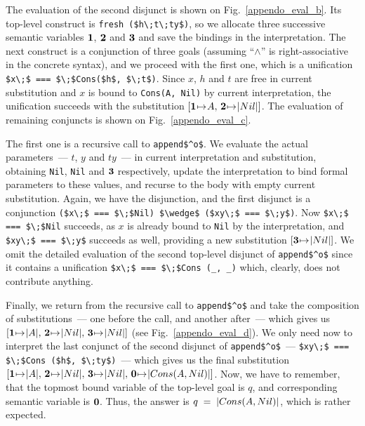 The evaluation of the second disjunct is shown on Fig.~\ref{appendo_eval_b}. Its top-level construct is \lstinline|fresh ($h\;t\;ty$)|, so we allocate three successive 
semantic variables $\mbox{\textbf{1}}$, $\mbox{\textbf{2}}$ and $\mbox{\textbf{3}}$ and save the bindings in the interpretation. The next construct is a conjunction of three goals (assuming
``$\wedge$'' is right-associative in the concrete syntax), and we proceed with the first one, which is a unification \mbox{\lstinline|$x\;$ === $\;$Cons($h$, $\;t$)|}. 
Since $x$, $h$ and $t$ are free in current substitution and $x$ is bound to \lstinline|Cons(A, Nil)| by current interpretation, the unification succeeds with the 
substitution \mbox{$[\bnd{\sv{1}}{\lstinline{A}},\,\bnd{\sv{2}}{\lstinline|Nil|}]$}. The evaluation of remaining conjuncts is shown on Fig.~\ref{appendo_eval_c}.

\FloatBarrier
The first one is a recursive call to \lstinline|append$^o$|. We evaluate the actual parameters~--- $t$, $y$ and $ty$~--- in current interpretation and substitution, 
obtaining \lstinline|Nil|, \lstinline|Nil| and $\mbox{\textbf{3}}$ respectively, update the interpretation to bind formal parameters to these values, and recurse to the body with
empty current substitution. Again, we have the disjunction, and the first disjunct is a conjunction \mbox{\lstinline|($x\;$ === $\;$Nil) $\wedge$ ($xy\;$ === $\;y$)|}.
Now \mbox{\lstinline|$x\;$ === $\;$Nil|} succeeds, as $x$ is already bound to \lstinline|Nil| by the interpretation, and \mbox{\lstinline|$xy\;$ === $\;y$|} succeeds
as well, providing a new substitution \mbox{$[\bnd{\sv{3}}{\lstinline|Nil|}]$}. We omit the detailed evaluation of the second top-level disjunct of \lstinline|append$^o$| since
it contains a unification \lstinline|$x\;$ === $\;$Cons (_, _)| which, clearly, does not contribute anything.

Finally, we return from the recursive call to \lstinline|append$^o$| and take the composition of substitutions~--- one before the call, and another after~--- which
gives us \mbox{$[\bnd{\sv{1}}{\lstinline|A|},\,\bnd{\sv{2}}{\lstinline|Nil|},\,\bnd{\sv{3}}{\lstinline|Nil|}]$} (see Fig.~\ref{appendo_eval_d}). We only need now to 
interpret the last conjunct of the second disjunct of \lstinline|append$^o$|~--- \mbox{\lstinline|$xy\;$ === $\;$Cons ($h$, $\;ty$)|}~--- which gives us the
final substitution \mbox{$[\bnd{\sv{1}}{\lstinline|A|},\,\bnd{\sv{2}}{\lstinline|Nil|},\,\bnd{\sv{3}}{\lstinline|Nil|},\,\bnd{\sv{0}}{\lstinline|Cons (A, Nil)|}]$}. Now, we
have to remember, that the topmost bound variable of the top-level goal is $q$, and corresponding semantic variable is $\mbox{\textbf{0}}$. Thus, the answer is 
\mbox{$q\;=\;\lstinline|Cons (A, Nil)|$}, which is rather expected.